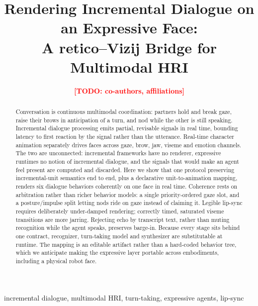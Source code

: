\documentclass[conference]{IEEEtran}
\newcommand{\todo}[1]{\textcolor{red}{\textbf{[TODO: #1]}}}
\begin{document}
\title{Rendering Incremental Dialogue on an Expressive Face:\\
A retico--Vizij Bridge for Multimodal HRI}

\author{
\todo{co-authors, affiliations}}

\maketitle

\begin{abstract}
Conversation is continuous multimodal coordination: partners hold and break gaze,
raise their brows in anticipation of a turn, and nod while the other is still
speaking. Incremental dialogue processing emits partial, revisable signals in real
time, bounding latency to first reaction by the signal rather than the utterance.
Real-time character animation separately drives faces across gaze, brow, jaw,
viseme and emotion channels. The two are unconnected: incremental frameworks have
no renderer, expressive runtimes no notion of incremental dialogue, and the
signals that would make an agent feel present are computed and discarded. Here we
show that one protocol preserving incremental-unit semantics end to end, plus a
declarative unit-to-animation mapping, renders six dialogue behaviors coherently
on one face in real time. Coherence rests on arbitration rather than richer
behavior models: a single priority-ordered gaze slot, and a posture/impulse split
letting nods ride on gaze instead of claiming it. Legible lip-sync requires
deliberately under-damped rendering; correctly timed, saturated viseme transitions
are more jarring. Rejecting echo by transcript text, rather than muting
recognition while the agent speaks, preserves barge-in. Because every stage sits
behind one contract, recognizer, turn-taking model and synthesizer are
substitutable at runtime. The mapping is an editable artifact rather than a
hard-coded behavior tree, which we anticipate making the expressive layer portable
across embodiments, including a physical robot face.
\end{abstract}

\begin{IEEEkeywords}
incremental dialogue, multimodal HRI, turn-taking, expressive agents, lip-sync
\end{IEEEkeywords}
\end{document}
